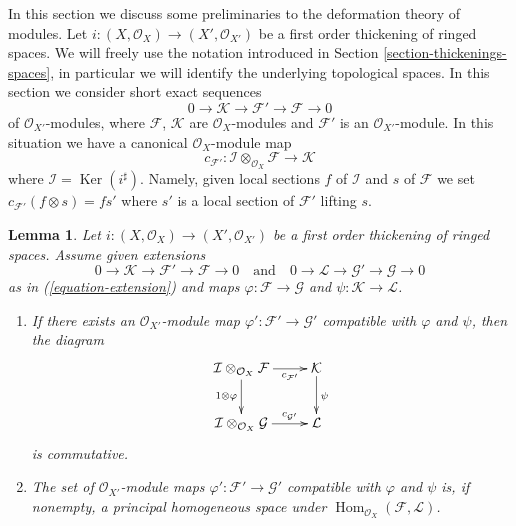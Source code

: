 \documentclass{stacks-project}
\theoremstyle{plain}
\newtheorem{lemma}[subsection]{Lemma}
\theoremstyle{definition}
\theoremstyle{remark}
\numberwithin{equation}{subsection}
\def\Hom{\mathop{\mathrm{Hom}}\nolimits}
\def\Ker{\mathop{\mathrm{Ker}}}
\begin{document}
\noindent
In this section we discuss some preliminaries to the deformation theory
of modules. Let $i : (X, \mathcal{O}_X) \to (X', \mathcal{O}_{X'})$
be a first order thickening of ringed spaces. We will freely use the notation
introduced in Section \ref{section-thickenings-spaces}, in particular we will
identify the underlying topological spaces.
In this section we consider short exact sequences
\begin{equation}
\label{equation-extension}
0 \to \mathcal{K} \to \mathcal{F}' \to \mathcal{F} \to 0
\end{equation}
of $\mathcal{O}_{X'}$-modules, where $\mathcal{F}$, $\mathcal{K}$ are
$\mathcal{O}_X$-modules and $\mathcal{F}'$ is an $\mathcal{O}_{X'}$-module.
In this situation we have a canonical $\mathcal{O}_X$-module map
$$
c_{\mathcal{F}'} :
\mathcal{I} \otimes_{\mathcal{O}_X} \mathcal{F}
\longrightarrow
\mathcal{K}
$$
where $\mathcal{I} = \Ker(i^\sharp)$.
Namely, given local sections $f$ of $\mathcal{I}$ and $s$
of $\mathcal{F}$ we set $c_{\mathcal{F}'}(f \otimes s) = fs'$
where $s'$ is a local section of $\mathcal{F}'$ lifting $s$.

\begin{lemma}
\label{lemma-inf-map}
Let $i : (X, \mathcal{O}_X) \to (X', \mathcal{O}_{X'})$
be a first order thickening of ringed spaces. Assume given
extensions
$$
0 \to \mathcal{K} \to \mathcal{F}' \to \mathcal{F} \to 0
\quad\text{and}\quad
0 \to \mathcal{L} \to \mathcal{G}' \to \mathcal{G} \to 0
$$
as in (\ref{equation-extension})
and maps $\varphi : \mathcal{F} \to \mathcal{G}$ and
$\psi : \mathcal{K} \to \mathcal{L}$.
\begin{enumerate}
\item If there exists an $\mathcal{O}_{X'}$-module
map $\varphi' : \mathcal{F}' \to \mathcal{G}'$ compatible with $\varphi$
and $\psi$, then the diagram
$$
\xymatrix{
\mathcal{I} \otimes_{\mathcal{O}_X} \mathcal{F}
\ar[r]_-{c_{\mathcal{F}'}} \ar[d]_{1 \otimes \varphi} &
\mathcal{K} \ar[d]^\psi \\
\mathcal{I} \otimes_{\mathcal{O}_X} \mathcal{G}
\ar[r]^-{c_{\mathcal{G}'}} &
\mathcal{L}
}
$$
is commutative.
\item The set of $\mathcal{O}_{X'}$-module
maps $\varphi' : \mathcal{F}' \to \mathcal{G}'$ compatible with $\varphi$
and $\psi$ is, if nonempty, a principal homogeneous space under
$\Hom_{\mathcal{O}_X}(\mathcal{F}, \mathcal{L})$.
\end{enumerate}
\end{lemma}
\end{document}
